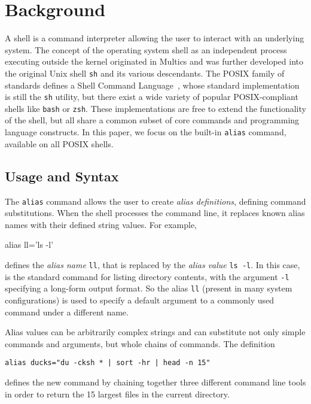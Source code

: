\section{Background}

A shell is a command interpreter allowing the user to interact with an underlying system.
The concept of the operating system shell as an independent process executing outside the kernel originated in Multics and was further developed into the original Unix shell \texttt{sh} and its various descendants.
The POSIX family of standards defines a Shell Command Language~\cite{posix_standard, greenberg:17}, whose standard implementation is still the \texttt{sh} utility, but there exist a wide variety of popular POSIX-compliant shells like \texttt{bash} or \texttt{zsh}.
These implementations are free to extend the functionality of the shell, but all share a common subset of core commands and programming language constructs.
In this paper, we focus on the built-in \texttt{alias} command, available on all POSIX shells.

\subsection{Usage and Syntax}

The \texttt{alias} command allows the user to create \emph{alias definitions}, defining command substitutions.
When the shell processes the command line, it replaces known alias names with their defined string values.
For example, 
\begin{CVerbatim}
alias ll='ls -l'
\end{CVerbatim}
defines the \emph{alias name} \texttt{ll}, that is replaced by the \emph{alias value} \texttt{ls -l}.
In this case,  is the standard command for listing directory contents, with the argument \texttt{-l} specifying a long-form output format.
So the alias \texttt{ll} (present in many system configurations) is used to specify a default argument to a commonly used command under a different name.

Alias values can be arbitrarily complex strings and can substitute not only simple commands and arguments, but whole chains of commands. 
The definition
\begin{Verbatim}[breaklines=true]
alias ducks="du -cksh * | sort -hr | head -n 15"
\end{Verbatim}
defines the new command  by chaining together three different command line tools in order to return the 15 largest files in the current directory.

